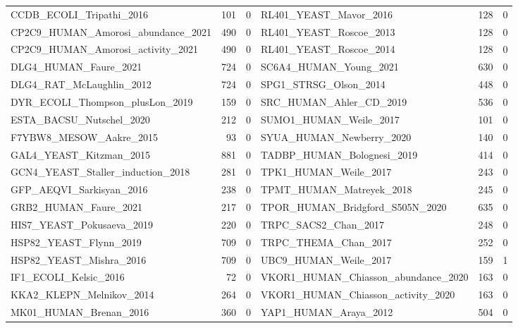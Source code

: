 \documentclass[11pt,a4paper]{article}
\begin{document}
\begin{table}[H]
{\begin{tabular}{lrrlrr}
CCDB\_ECOLI\_Tripathi\_2016 & 101 & 0 & RL401\_YEAST\_Mavor\_2016 & 128 & 0 \\
CP2C9\_HUMAN\_Amorosi\_abundance\_2021 & 490 & 0 & RL401\_YEAST\_Roscoe\_2013 & 128 & 0 \\
CP2C9\_HUMAN\_Amorosi\_activity\_2021 & 490 & 0 & RL401\_YEAST\_Roscoe\_2014 & 128 & 0 \\
DLG4\_HUMAN\_Faure\_2021 & 724 & 0 & SC6A4\_HUMAN\_Young\_2021 & 630 & 0 \\
DLG4\_RAT\_McLaughlin\_2012 & 724 & 0 & SPG1\_STRSG\_Olson\_2014 & 448 & 0 \\
DYR\_ECOLI\_Thompson\_plusLon\_2019 & 159 & 0 & SRC\_HUMAN\_Ahler\_CD\_2019 & 536 & 0 \\
ESTA\_BACSU\_Nutschel\_2020 & 212 & 0 & SUMO1\_HUMAN\_Weile\_2017 & 101 & 0 \\
F7YBW8\_MESOW\_Aakre\_2015 & 93 & 0 & SYUA\_HUMAN\_Newberry\_2020 & 140 & 0 \\
GAL4\_YEAST\_Kitzman\_2015 & 881 & 0 & TADBP\_HUMAN\_Bolognesi\_2019 & 414 & 0 \\
GCN4\_YEAST\_Staller\_induction\_2018 & 281 & 0 & TPK1\_HUMAN\_Weile\_2017 & 243 & 0 \\
GFP\_AEQVI\_Sarkisyan\_2016 & 238 & 0 & TPMT\_HUMAN\_Matreyek\_2018 & 245 & 0 \\
GRB2\_HUMAN\_Faure\_2021 & 217 & 0 & TPOR\_HUMAN\_Bridgford\_S505N\_2020 & 635 & 0 \\
HIS7\_YEAST\_Pokusaeva\_2019 & 220 & 0 & TRPC\_SACS2\_Chan\_2017 & 248 & 0 \\
HSP82\_YEAST\_Flynn\_2019 & 709 & 0 & TRPC\_THEMA\_Chan\_2017 & 252 & 0 \\
HSP82\_YEAST\_Mishra\_2016 & 709 & 0 & UBC9\_HUMAN\_Weile\_2017 & 159 & 1 \\
IF1\_ECOLI\_Kelsic\_2016 & 72 & 0 & VKOR1\_HUMAN\_Chiasson\_abundance\_2020 & 163 & 0 \\
KKA2\_KLEPN\_Melnikov\_2014 & 264 & 0 & VKOR1\_HUMAN\_Chiasson\_activity\_2020 & 163 & 0 \\
MK01\_HUMAN\_Brenan\_2016 & 360 & 0 & YAP1\_HUMAN\_Araya\_2012 & 504 & 0 \\
\bottomrule
\end{tabular}}\end{table}
\end{document}
